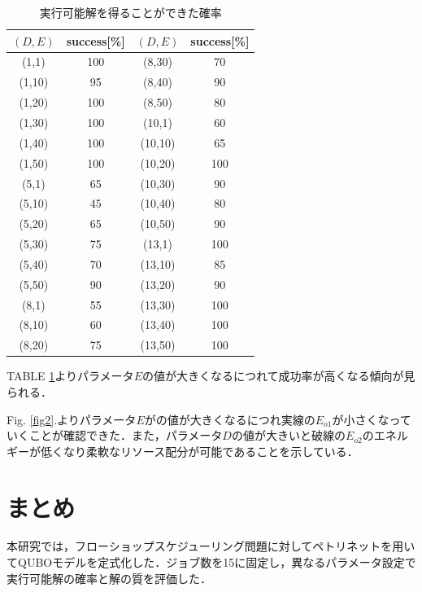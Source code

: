 \documentclass[conference]{IEEEtran}
\begin{document}
\begin{table}[h]
    \centering
    \caption{実行可能解を得ることができた確率}
    \label{feasible}
    \begin{tabular}{|c|c|c|c|}
        \hline
        $(D,E)$ & success[\%] & $(D,E)$ & success[\%] \\ \hline
        (1,1) & 100 & (8,30) & 70 \\ \hline
        (1,10) & 95 & (8,40) & 90 \\ \hline
        (1,20) & 100 & (8,50) & 80 \\ \hline
        (1,30) & 100 & (10,1) & 60 \\ \hline
        (1,40) & 100 & (10,10) & 65 \\ \hline
        (1,50) & 100 & (10,20) & 100 \\ \hline
        (5,1) & 65 & (10,30) & 90 \\ \hline
        (5,10) & 45 & (10,40) & 80 \\ \hline
        (5,20) & 65 & (10,50) & 90 \\ \hline
        (5,30) & 75 & (13,1) & 100 \\ \hline
        (5,40) & 70 & (13,10) & 85 \\ \hline
        (5,50) & 90 & (13,20) & 90 \\ \hline
        (8,1) & 55 & (13,30) & 100 \\ \hline
        (8,10) & 60 & (13,40) & 100 \\ \hline
        (8,20) & 75 & (13,50) & 100 \\ \hline
    \end{tabular}
\end{table}



TABLE \ref{feasible}よりパラメータ$E$の値が大きくなるにつれて成功率が高くなる傾向が見られる．

Fig. \ref{fig2}.よりパラメータ$E$がの値が大きくなるにつれ実線の$E_{o1}$が小さくなっていくことが確認できた．また，パラメータ$D$の値が大きいと破線の$E_{o2}$のエネルギーが低くなり柔軟なリソース配分が可能であることを示している．

\section{まとめ}
本研究では，フローショップスケジューリング問題に対してペトリネットを用いてQUBOモデルを定式化した．ジョブ数を15に固定し，異なるパラメータ設定で実行可能解の確率と解の質を評価した．
\end{document}
